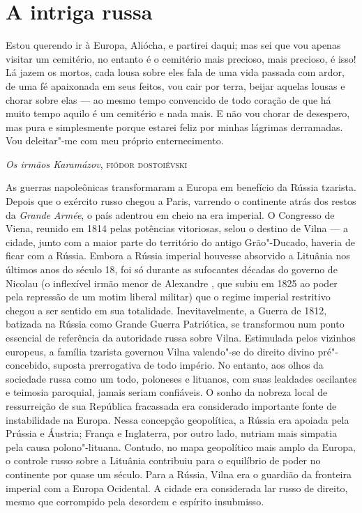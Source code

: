 %

\chapter{A intriga russa}

\epigraph{Estou querendo ir à Europa, Aliócha, e partirei daqui; mas sei que vou
apenas visitar um cemitério, no entanto é o cemitério mais precioso,
mais precioso, é isso! Lá jazem os mortos, cada lousa sobre eles fala de
uma vida passada com ardor, de uma fé apaixonada em seus feitos, vou
cair por terra, beijar aquelas lousas e chorar sobre elas --- ao mesmo
tempo convencido de todo coração de que há muito tempo aquilo é um
cemitério e nada mais. E não vou chorar de desespero, mas pura e
simplesmente porque estarei feliz por minhas lágrimas derramadas. Vou
deleitar"-me com meu próprio enternecimento.}{\emph{Os irmãos Karamázov}, \textsc{fiódor dostoiévski}\footnotemark}


As guerras napoleônicas transformaram a Europa em benefício da Rússia
tzarista. Depois que o exército russo chegou a Paris, varrendo o
continente atrás dos restos da \emph{Grande Armée}, o país adentrou em
cheio na era imperial. 
O Congresso de Viena, reunido em 1814 pelas
potências vitoriosas, selou o destino de Vilna --- a cidade, junto com
a maior parte do território do antigo Grão"-Ducado, haveria de ficar com a
Rússia. Embora a Rússia imperial houvesse absorvido a Lituânia nos
últimos anos do século 18, foi só durante as sufocantes décadas do
governo de Nicolau  (o inflexível irmão menor de Alexandre , que subiu
em 1825 ao poder pela repressão de um motim liberal militar) que o
regime imperial restritivo chegou a ser sentido em sua totalidade.
Inevitavelmente, a Guerra de 1812, batizada na Rússia como Grande Guerra
Patriótica, se transformou num ponto essencial de referência da
autoridade russa sobre Vilna. Estimulada pelos vizinhos europeus, a
família tzarista governou Vilna valendo"-se do direito divino
pré"-concebido, suposta prerrogativa de todo império. No entanto, aos
olhos da sociedade russa como um todo, poloneses e lituanos, com suas
lealdades oscilantes e teimosia paroquial, jamais seriam confiáveis. O
sonho da nobreza local de ressurreição de sua República fracassada era
considerado importante fonte de instabilidade na Europa. Nessa concepção
geopolítica, a Rússia era apoiada pela Prússia e Áustria; França e
Inglaterra, por outro lado, nutriam mais simpatia pela causa
polono"-lituana. Contudo, no mapa geopolítico mais amplo da Europa, o
controle russo sobre a Lituânia contribuiu para o equilíbrio de poder no
continente por quase um século. Para a Rússia, Vilna era o guardião da
fronteira imperial com a Europa Ocidental. A cidade era considerada lar
russo de direito, mesmo que corrompido pela desordem e espírito
insubmisso.

